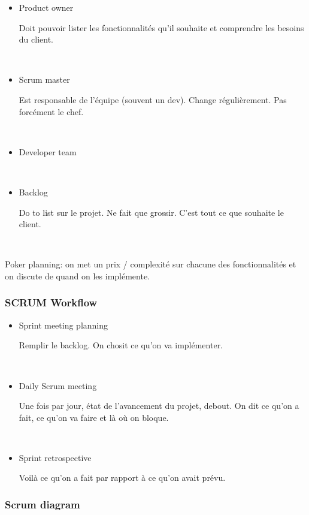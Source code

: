 \documentclass[a4paper,11pt]{article}
\begin{document}
\begin{itemize}

\item Product owner

  Doit pouvoir lister les fonctionnalités qu'il souhaite et comprendre les
  besoins du client.

  \

\item Scrum master

  Est responsable de l'équipe (souvent un dev). Change régulièrement. Pas
  forcément le chef.

  \

\item Developer team

  \

\item Backlog

  Do to list sur le projet. Ne fait que grossir. C'est tout ce que souhaite le
  client.

  \

\end{itemize}

Poker planning: on met un prix / complexité sur chacune des fonctionnalités et
on discute de quand on les implémente.

\subsubsection{SCRUM Workflow}

\begin{itemize}
\item Sprint meeting planning

  Remplir le backlog. On chosit ce qu'on va implémenter.

  \

\item Daily Scrum meeting

  Une fois par jour, état de l'avancement du projet, debout.
  On dit ce qu'on a fait, ce qu'on va faire et là où on bloque.

  \

\item Sprint retrospective

  Voilà ce qu'on a fait par rapport à ce qu'on avait prévu.
\end{itemize}

\subsubsection{Scrum diagram}
\end{document}
